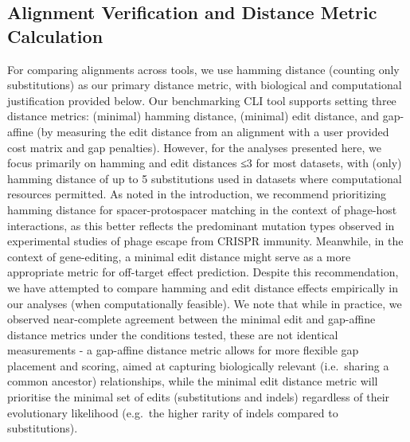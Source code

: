 \documentclass[
]{article}
\begin{document}
\subsection{Alignment Verification and Distance Metric
Calculation}\label{sec-alignment-recalc}

For comparing alignments across tools, we use hamming distance (counting
only substitutions) as our primary distance metric, with biological and
computational justification provided below. Our benchmarking CLI tool
supports setting three distance metrics: (minimal) hamming distance,
(minimal) edit distance, and gap-affine (by measuring the edit distance
from an alignment with a user provided cost matrix and gap penalties).
However, for the analyses presented here, we focus primarily on hamming
and edit distances ≤3 for most datasets, with (only) hamming distance of
up to 5 substitutions used in datasets where computational resources
permitted. As noted in the introduction, we recommend prioritizing
hamming distance for spacer-protospacer matching in the context of
phage-host interactions, as this better reflects the predominant
mutation types observed in experimental studies of phage escape from
CRISPR immunity. Meanwhile, in the context of gene-editing, a minimal
edit distance might serve as a more appropriate metric for off-target
effect prediction. Despite this recommendation, we have attempted to
compare hamming and edit distance effects empirically in our analyses
(when computationally feasible). We note that while in practice, we
observed near-complete agreement between the minimal edit and gap-affine
distance metrics under the conditions tested, these are not identical
measurements - a gap-affine distance metric allows for more flexible gap
placement and scoring, aimed at capturing biologically relevant
(i.e.~sharing a common ancestor) relationships, while the minimal edit
distance metric will prioritise the minimal set of edits (substitutions
and indels) regardless of their evolutionary likelihood (e.g.~the higher
rarity of indels compared to substitutions).
\end{document}
